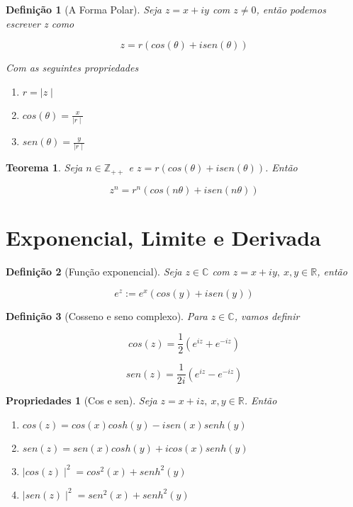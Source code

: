 \documentclass{article}
\newtheorem{prop}{Propriedades}
\newtheorem{theorem}{Teorema}
\newtheorem{definition}{Definição}
\begin{document}
\begin{definition}[A Forma Polar]
Seja $z = x + iy$ com $z \neq 0$, então podemos escrever z como

$$z = r(cos(\theta) + i sen(\theta))$$

Com as seguintes propriedades

\begin{enumerate}
    \item $r = \mid z \mid $
    
    \item $cos(\theta) = \frac{x}{\mid r \mid}$
    
    \item $sen(\theta) = \frac{y}{\mid r \mid}$
\end{enumerate}
\end{definition}

\begin{theorem}
Seja $n \in \mathbb{Z}_{++}$ e $z = r(cos(\theta) + i sen(\theta))$. Então

$$z^n = r^n (cos(n\theta) + i sen(n\theta))$$
\end{theorem}

\section*{Exponencial, Limite e Derivada}
\label{s2}
\begin{definition}[Função exponencial]
Seja $z \in \mathbb{C}$ com $z = x + iy,\ x,y \in \mathbb{R}$, então 

$$e^z := e^x(cos(y) + i sen(y))$$
\end{definition}

\begin{definition}[Cosseno e seno complexo]
Para $z \in \mathbb{C}$, vamos definir

$$cos(z) = \frac{1}{2}(e^{iz} + e^{- iz})$$

$$sen(z) = \frac{1}{2 i}(e^{iz} - e^{- iz})$$
\end{definition}


\begin{prop}[Cos e sen]
Seja $z = x + iz,\ x, y \in \mathbb{R}$. Então

\begin{enumerate}[label=(\alph*)]
    \item $cos(z) = cos(x) cosh(y) - i sen(x) senh(y)$
    
    \item $sen(z) = sen(x) cosh(y) + i cos(x) senh(y)$
    
    \item $\mid cos(z) \mid^2 = cos^2(x) + senh^2(y)$
    
    \item $\mid sen(z) \mid^2 = sen^2(x) + senh^2(y)$
\end{enumerate}
\end{prop}
\end{document}
